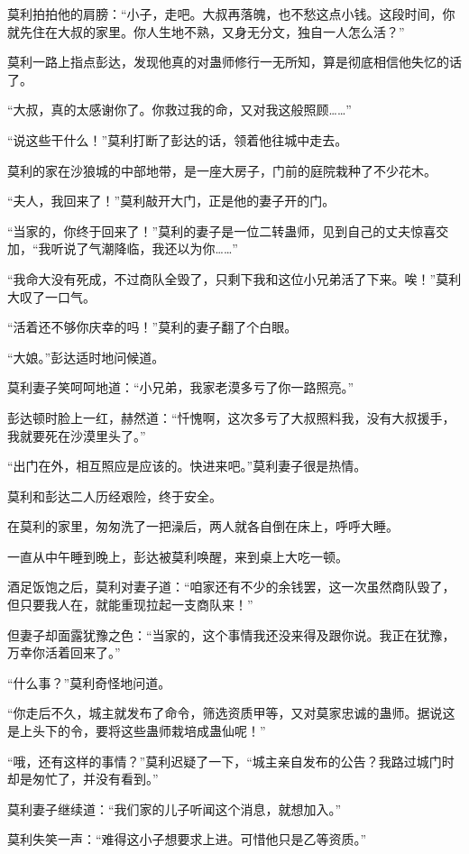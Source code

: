 \begin{this_body}
莫利拍拍他的肩膀：“小子，走吧。大叔再落魄，也不愁这点小钱。这段时间，你就先住在大叔的家里。你人生地不熟，又身无分文，独自一人怎么活？”

莫利一路上指点彭达，发现他真的对蛊师修行一无所知，算是彻底相信他失忆的话了。

“大叔，真的太感谢你了。你救过我的命，又对我这般照顾……”

“说这些干什么！”莫利打断了彭达的话，领着他往城中走去。

莫利的家在沙狼城的中部地带，是一座大房子，门前的庭院栽种了不少花木。

“夫人，我回来了！”莫利敲开大门，正是他的妻子开的门。

“当家的，你终于回来了！”莫利的妻子是一位二转蛊师，见到自己的丈夫惊喜交加，“我听说了气潮降临，我还以为你……”

“我命大没有死成，不过商队全毁了，只剩下我和这位小兄弟活了下来。唉！”莫利大叹了一口气。

“活着还不够你庆幸的吗！”莫利的妻子翻了个白眼。

“大娘。”彭达适时地问候道。

莫利妻子笑呵呵地道：“小兄弟，我家老漠多亏了你一路照亮。”

彭达顿时脸上一红，赫然道：“忏愧啊，这次多亏了大叔照料我，没有大叔援手，我就要死在沙漠里头了。”

“出门在外，相互照应是应该的。快进来吧。”莫利妻子很是热情。

莫利和彭达二人历经艰险，终于安全。

在莫利的家里，匆匆洗了一把澡后，两人就各自倒在床上，呼呼大睡。

一直从中午睡到晚上，彭达被莫利唤醒，来到桌上大吃一顿。

酒足饭饱之后，莫利对妻子道：“咱家还有不少的余钱罢，这一次虽然商队毁了，但只要我人在，就能重现拉起一支商队来！”

但妻子却面露犹豫之色：“当家的，这个事情我还没来得及跟你说。我正在犹豫，万幸你活着回来了。”

“什么事？”莫利奇怪地问道。

“你走后不久，城主就发布了命令，筛选资质甲等，又对莫家忠诚的蛊师。据说这是上头下的令，要将这些蛊师栽培成蛊仙呢！”

“哦，还有这样的事情？”莫利迟疑了一下，“城主亲自发布的公告？我路过城门时却是匆忙了，并没有看到。”

莫利妻子继续道：“我们家的儿子听闻这个消息，就想加入。”

莫利失笑一声：“难得这小子想要求上进。可惜他只是乙等资质。”


\end{this_body}
